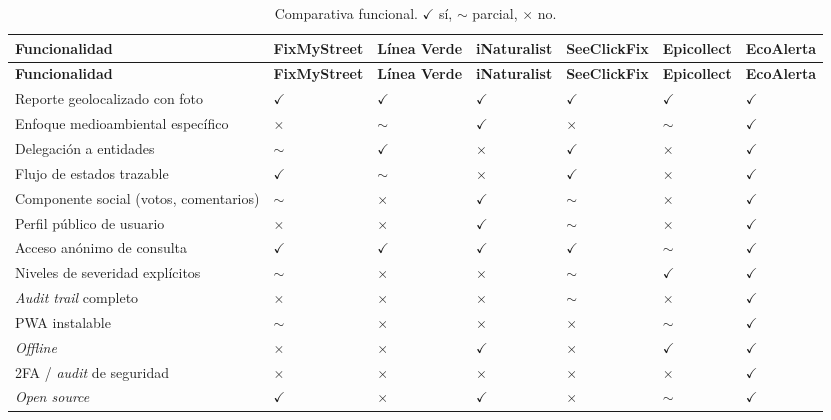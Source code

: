 \begin{longtable}{@{}L{4.5cm}C{1.4cm}C{1.4cm}C{1.4cm}C{1.4cm}C{1.4cm}C{1.4cm}@{}}
\caption{Comparativa funcional. $\checkmark${} sí, $\sim${} parcial, $\times${} no.} \label{tab:comparativa-funcional} \\
\toprule
\textbf{Funcionalidad} & \textbf{FixMy\-Street} & \textbf{Línea Verde} & \textbf{iNatu\-ralist} & \textbf{SeeClick\-Fix} & \textbf{Epi\-collect} & \textbf{Eco\-Alerta} \\
\midrule
\endfirsthead
\toprule
\textbf{Funcionalidad} & \textbf{FixMy\-Street} & \textbf{Línea Verde} & \textbf{iNatu\-ralist} & \textbf{SeeClick\-Fix} & \textbf{Epi\-collect} & \textbf{Eco\-Alerta} \\
\midrule
\endhead
\bottomrule
\endfoot
Reporte geolocalizado con foto    & $\checkmark$ & $\checkmark$ & $\checkmark$ & $\checkmark$ & $\checkmark$ & $\checkmark$ \\
Enfoque medioambiental específico & $\times$ & $\sim$ & $\checkmark$ & $\times$ & $\sim$ & $\checkmark$ \\
Delegación a entidades            & $\sim$ & $\checkmark$ & $\times$ & $\checkmark$ & $\times$ & $\checkmark$ \\
Flujo de estados trazable         & $\checkmark$ & $\sim$ & $\times$ & $\checkmark$ & $\times$ & $\checkmark$ \\
Componente social (votos, comentarios) & $\sim$ & $\times$ & $\checkmark$ & $\sim$ & $\times$ & $\checkmark$ \\
Perfil público de usuario         & $\times$ & $\times$ & $\checkmark$ & $\sim$ & $\times$ & $\checkmark$ \\
Acceso anónimo de consulta        & $\checkmark$ & $\checkmark$ & $\checkmark$ & $\checkmark$ & $\sim$ & $\checkmark$ \\
Niveles de severidad explícitos   & $\sim$ & $\times$ & $\times$ & $\sim$ & $\checkmark$ & $\checkmark$ \\
\textit{Audit trail} completo     & $\times$ & $\times$ & $\times$ & $\sim$ & $\times$ & $\checkmark$ \\
PWA instalable                    & $\sim$ & $\times$ & $\times$ & $\times$ & $\sim$ & $\checkmark$ \\
\textit{Offline}                  & $\times$ & $\times$ & $\checkmark$ & $\times$ & $\checkmark$ & $\checkmark$ \\
2FA / \textit{audit} de seguridad & $\times$ & $\times$ & $\times$ & $\times$ & $\times$ & $\checkmark$ \\
\textit{Open source}              & $\checkmark$ & $\times$ & $\checkmark$ & $\times$ & $\sim$ & $\checkmark$ \\
\end{longtable}

